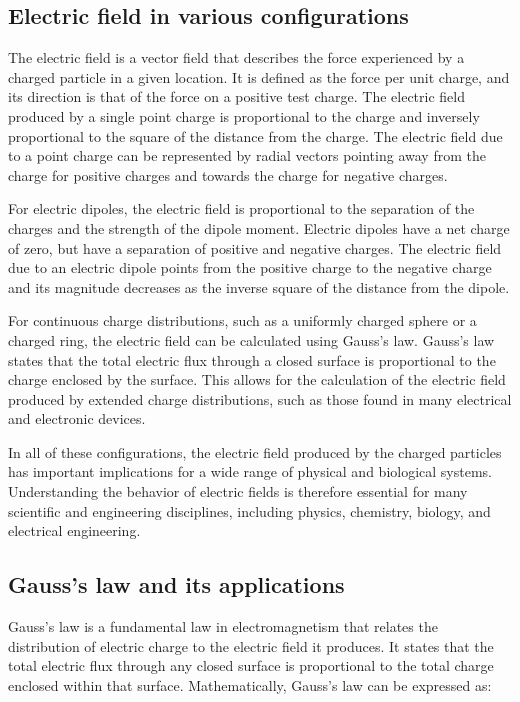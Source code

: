 \documentclass{article}
\begin{document}
\subsection{Electric field in various configurations} %
\label{ssub:Electric field in various configurations}
The electric field is a vector field that describes the force experienced by a
charged particle in a given location. It is defined as the force per unit
charge, and its direction is that of the force on a positive test charge. The
electric field produced by a single point charge is proportional to the charge
and inversely proportional to the square of the distance from the charge. The
electric field due to a point charge can be represented by radial vectors
pointing away from the charge for positive charges and towards the charge for
negative charges.

For electric dipoles, the electric field is proportional to the separation of
the charges and the strength of the dipole moment. Electric dipoles have a net
charge of zero, but have a separation of positive and negative charges. The
electric field due to an electric dipole points from the positive charge to the
negative charge and its magnitude decreases as the inverse square of the
distance from the dipole.

For continuous charge distributions, such as a uniformly charged sphere or a
charged ring, the electric field can be calculated using Gauss's law. Gauss's
law states that the total electric flux through a closed surface is
proportional to the charge enclosed by the surface. This allows for the
calculation of the electric field produced by extended charge distributions,
such as those found in many electrical and electronic devices.

In all of these configurations, the electric field produced by the charged
particles has important implications for a wide range of physical and
biological systems. Understanding the behavior of electric fields is therefore
essential for many scientific and engineering disciplines, including physics,
chemistry, biology, and electrical engineering.
\subsection{Gauss's law and its applications} %
\label{ssub:Gauss's law and its applications}
Gauss's law is a fundamental law in electromagnetism that relates the
distribution of electric charge to the electric field it produces. It states
that the total electric flux through any closed surface is proportional to the
total charge enclosed within that surface. Mathematically, Gauss's law can be
expressed as:
\end{document}
